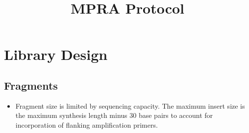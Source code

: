 \documentclass[a4paper]{article}
\title{MPRA Protocol}
\begin{document}
\maketitle

\newpage
\tableofcontents
\newpage

\section{Library Design}
	\subsection{Fragments} 
    	\begin{itemize}
                	
            \item Fragment size is limited by sequencing capacity. The maximum insert size is the maximum synthesis length minus 30 base pairs to account for incorporation of flanking amplification primers. 
                              
    	\end{itemize}
	
\end{document}

